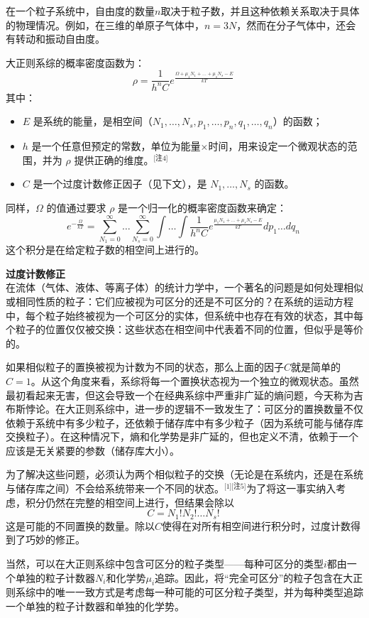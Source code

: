 在一个粒子系统中，自由度的数量\( n \)取决于粒子数，并且这种依赖关系取决于具体的物理情况。例如，在三维的单原子气体中，\( n = 3N \)，然而在分子气体中，还会有转动和振动自由度。

大正则系综的概率密度函数为：
\[
\rho = \frac{1}{h^n C} e^{\frac{\Omega + \mu_1 N_1 + \dots + \mu_s N_s - E}{kT}}~
\]
其中：
\begin{itemize}
\item \( E \) 是系统的能量，是相空间（\( N_1, \dots, N_s, p_1, \dots, p_n, q_1, \dots, q_n \)）的函数；
\item \( h \) 是一个任意但预定的常数，单位为能量×时间，用来设定一个微观状态的范围，并为 \( \rho \) 提供正确的维度。\(^\text{[注4]}\)
\item \( C \) 是一个过度计数修正因子（见下文），是 \( N_1, \dots, N_s \) 的函数。
\end{itemize}
同样，\( \Omega \) 的值通过要求 \( \rho \) 是一个归一化的概率密度函数来确定：
\[
e^{-\frac{\Omega}{kT}} = \sum_{N_1=0}^{\infty} \dots \sum_{N_s=0}^{\infty} \int \dots \int \frac{1}{h^n C} e^{\frac{\mu_1 N_1 + \dots + \mu_s N_s - E}{kT}} dp_1 \dots dq_n~
\]
这个积分是在给定粒子数的相空间上进行的。

\textbf{过度计数修正}\\

 
在流体（气体、液体、等离子体）的统计力学中，一个著名的问题是如何处理相似或相同性质的粒子：它们应被视为可区分的还是不可区分的？在系统的运动方程中，每个粒子始终被视为一个可区分的实体，但系统中也存在有效的状态，其中每个粒子的位置仅仅被交换：这些状态在相空间中代表着不同的位置，但似乎是等价的。

如果相似粒子的置换被视为计数为不同的状态，那么上面的因子\( C \)就是简单的\( C = 1 \)。从这个角度来看，系综将每一个置换状态视为一个独立的微观状态。虽然最初看起来无害，但这会导致一个在经典系综中严重非广延的熵问题，今天称为吉布斯悖论。在大正则系综中，进一步的逻辑不一致发生了：可区分的置换数量不仅依赖于系统中有多少粒子，还依赖于储存库中有多少粒子（因为系统可能与储存库交换粒子）。在这种情况下，熵和化学势是非广延的，但也定义不清，依赖于一个应该是无关紧要的参数（储存库大小）。

为了解决这些问题，必须认为两个相似粒子的交换（无论是在系统内，还是在系统与储存库之间）不会给系统带来一个不同的状态。\(^\text{[1][注5]}\)为了将这一事实纳入考虑，积分仍然在完整的相空间上进行，但结果会除以
\[
C = N_1! N_2! \dots N_s!~
\]
这是可能的不同置换的数量。除以\( C \)使得在对所有相空间进行积分时，过度计数得到了巧妙的修正。

当然，可以在大正则系综中包含可区分的粒子类型——每种可区分的类型\( i \)都由一个单独的粒子计数器\( N_i \)和化学势\( \mu_i \)追踪。因此，将“完全可区分”的粒子包含在大正则系综中的唯一一致方式是考虑每一种可能的可区分粒子类型，并为每种类型追踪一个单独的粒子计数器和单独的化学势。
